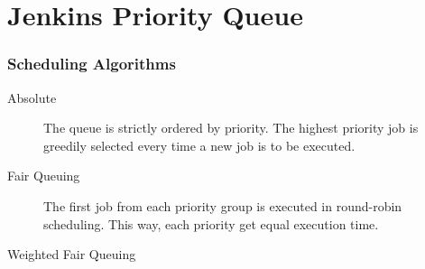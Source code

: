 \chapter{Jenkins Priority Queue}


\subsection{Scheduling Algorithms}


\begin{description}
  \item[Absolute] The queue is strictly ordered by priority. The highest priority job is greedily selected every time a new job is to be executed.
  \item[Fair Queuing] The first job from each priority group is executed in round-robin scheduling. This way, each priority get equal execution time.
  \item[Weighted Fair Queuing]
\end{description}